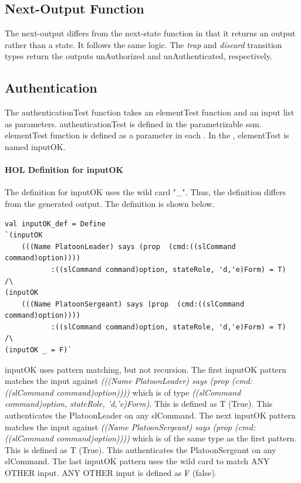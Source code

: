\documentclass[../../main/main.tex]{subfiles}
\begin{document}
\HOLPlanPBDefTheoremsgetReconXXdef

\subsection{Next-Output Function}
The next-output differs from the next-state function in that it returns an output rather than a state.  It follows the same logic.  The \textit{trap} and \textit{discard} transition types return the outputs unAuthorized and unAuthenticated, respectively.
\HOLssmPlanPBTheoremsplanPBOutXXdef


\subsection{Authentication}
The authenticationTest function takes an elementTest function and an input list as parameters.  authenticationTest is defined in the parametrizable ssm.  elementTest function is defined as a parameter in each .  In the , elementTest is named inputOK.  

\paragraph*{HOL Definition for inputOK}

The  definition for inputOK uses the wild card "_".  Thus, the  definition differs from the  generated output.  The  definition is shown below. 

\begin{lstlisting}
val inputOK_def = Define
`(inputOK
	(((Name PlatoonLeader) says (prop  (cmd:((slCommand command)option))))
	       :((slCommand command)option, stateRole, 'd,'e)Form) = T)  /\
(inputOK
	(((Name PlatoonSergeant) says (prop  (cmd:((slCommand command)option))))
	       :((slCommand command)option, stateRole, 'd,'e)Form) = T)  /\
(inputOK _ = F)`
\end{lstlisting}

inputOK uses pattern matching, but not recursion.  The first inputOK pattern matches the input against \textit{(((Name PlatoonLeader) says (prop  (cmd:((slCommand command)option))))} which is of type \textit{((slCommand command)option, stateRole, 'd,'e)Form)}.  This is defined as T (True).  This authenticates the PlatoonLeader on any slCommand.  The next inputOK pattern matches the input against \textit{((Name PlatoonSergeant) says (prop  (cmd:((slCommand command)option))))} which is of the same type as the first pattern.  This is defined as T (True).  This authenticates the PlatoonSergeant on any slCommand.  The last inputOK pattern uses the wild card to match ANY OTHER input.  ANY OTHER input is defined as F (false).
	 
\end{document}
